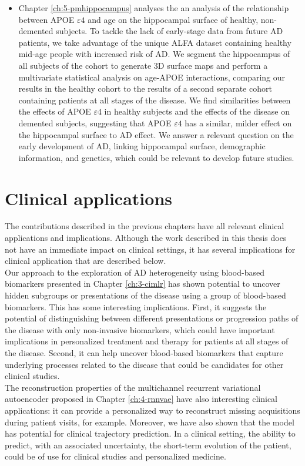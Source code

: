 \begin{itemize}
\item Chapter \ref{ch:5-pmhippocampus} analyses the an analysis of the relationship between APOE $\varepsilon4$ and age on the hippocampal surface of healthy, non-demented subjects. To tackle the lack of early-stage data from future AD patients, we take advantage of the unique ALFA dataset containing healthy mid-age people with increased risk of AD. We segment the hippocampus of all subjects of the cohort to generate 3D surface maps and perform a multivariate statistical analysis on age-APOE interactions, comparing our results in the healthy cohort to the results of a second separate cohort containing patients at all stages of the disease. We find similarities between the effects of APOE $\varepsilon4$ in healthy subjects and the effects of the disease on demented subjects, suggesting that APOE $\varepsilon4$ has a similar, milder effect on the hippocampal surface to AD effect. We answer a relevant question on the early development of AD, linking hippocampal surface, demographic information, and genetics, which could be relevant to develop future studies.
\end{itemize}

\section{Clinical applications}
The contributions described in the previous chapters have all relevant clinical applications and implications. Although the work described in this thesis does not have an immediate impact on clinical settings, it has several implications for clinical application that are described below. \\

Our approach to the exploration of AD heterogeneity using blood-based biomarkers presented in Chapter \ref{ch:3-cimlr} has shown potential to uncover hidden subgroups or presentations of the disease using a group of blood-based biomarkers. This has some interesting implications. First, it suggests the potential of distinguishing between different presentations or progression paths of the disease with only non-invasive biomarkers, which could have important implications in personalized treatment and therapy for patients at all stages of the disease. Second, it can help uncover blood-based biomarkers that capture underlying processes related to the disease that could be candidates for other clinical studies. \\

The reconstruction properties of the multichannel recurrent variational autoencoder proposed in Chapter \ref{ch:4-rnnvae} have also interesting clinical applications: it can provide a personalized way to reconstruct missing acquisitions during patient visits, for example. Moreover, we have also shown that the model has potential for clinical trajectory prediction. In a clinical setting, the ability to predict, with an associated uncertainty, the short-term evolution of the patient, could be of use for clinical studies and personalized medicine. \\

